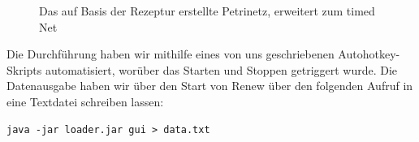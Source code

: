 \begin{figure}[ht]
  \caption{Das auf Basis der Rezeptur erstellte Petrinetz, erweitert zum timed Net}
  \label{pic:petrinetz}
\end{figure}

Die Durchführung haben wir mithilfe eines von uns geschriebenen Autohotkey-Skripts automatisiert, worüber das Starten und Stoppen getriggert wurde. Die Datenausgabe haben wir über den Start von Renew über den folgenden Aufruf in eine Textdatei schreiben lassen:
\begin{lstlisting}
java -jar loader.jar gui > data.txt
\end{lstlisting}


